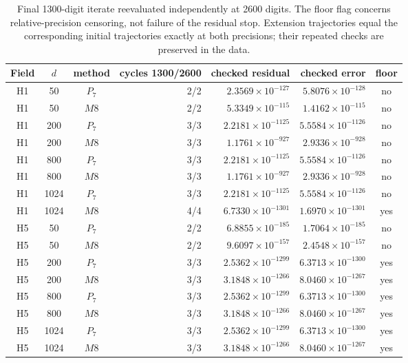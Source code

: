 \begin{table}[htbp]
\centering\scriptsize
\setlength{\tabcolsep}{3pt}
\caption{Final 1300-digit iterate reevaluated independently at 2600 digits. The floor flag concerns relative-precision censoring, not failure of the residual stop. Extension trajectories equal the corresponding initial trajectories exactly at both precisions; their repeated checks are preserved in the data.}\label{tab:ext-precision-external8}
\begin{tabular}{cccrrrc}\toprule
Field & $d$ & method & cycles 1300/2600 & checked residual & checked error & floor\\\midrule
H1 & 50 & $P_{7}$ & 2/2 & $2.3569\times10^{-127}$ & $5.8076\times10^{-128}$ & no\\
H1 & 50 & $M8$ & 2/2 & $5.3349\times10^{-115}$ & $1.4162\times10^{-115}$ & no\\
H1 & 200 & $P_{7}$ & 3/3 & $2.2181\times10^{-1125}$ & $5.5584\times10^{-1126}$ & no\\
H1 & 200 & $M8$ & 3/3 & $1.1761\times10^{-927}$ & $2.9336\times10^{-928}$ & no\\
H1 & 800 & $P_{7}$ & 3/3 & $2.2181\times10^{-1125}$ & $5.5584\times10^{-1126}$ & no\\
H1 & 800 & $M8$ & 3/3 & $1.1761\times10^{-927}$ & $2.9336\times10^{-928}$ & no\\
H1 & 1024 & $P_{7}$ & 3/3 & $2.2181\times10^{-1125}$ & $5.5584\times10^{-1126}$ & no\\
H1 & 1024 & $M8$ & 4/4 & $6.7330\times10^{-1301}$ & $1.6970\times10^{-1301}$ & yes\\
H5 & 50 & $P_{7}$ & 2/2 & $6.8855\times10^{-185}$ & $1.7064\times10^{-185}$ & no\\
H5 & 50 & $M8$ & 2/2 & $9.6097\times10^{-157}$ & $2.4548\times10^{-157}$ & no\\
H5 & 200 & $P_{7}$ & 3/3 & $2.5362\times10^{-1299}$ & $6.3713\times10^{-1300}$ & yes\\
H5 & 200 & $M8$ & 3/3 & $3.1848\times10^{-1266}$ & $8.0460\times10^{-1267}$ & yes\\
H5 & 800 & $P_{7}$ & 3/3 & $2.5362\times10^{-1299}$ & $6.3713\times10^{-1300}$ & yes\\
H5 & 800 & $M8$ & 3/3 & $3.1848\times10^{-1266}$ & $8.0460\times10^{-1267}$ & yes\\
H5 & 1024 & $P_{7}$ & 3/3 & $2.5362\times10^{-1299}$ & $6.3713\times10^{-1300}$ & yes\\
H5 & 1024 & $M8$ & 3/3 & $3.1848\times10^{-1266}$ & $8.0460\times10^{-1267}$ & yes\\
\bottomrule\end{tabular}
\end{table}
\FloatBarrier
